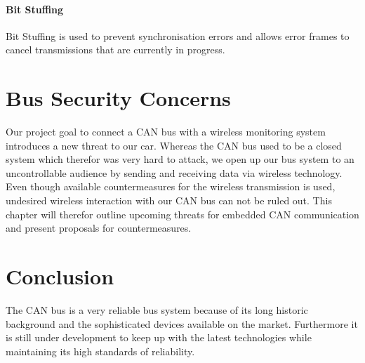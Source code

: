 	\paragraph{Bit Stuffing}
	Bit Stuffing is used to prevent synchronisation errors and allows error frames
	to cancel transmissions that are currently in progress.

\section{Bus Security Concerns}
Our project goal to connect a CAN bus with a wireless monitoring system
introduces a new threat to our car. Whereas the CAN bus used to be a closed
system which therefor was very hard to attack, we open up our bus
system to an uncontrollable audience by sending and receiving data via wireless
technology. Even though available countermeasures for the wireless
transmission is used, undesired wireless interaction with our CAN bus can not be
ruled out. This chapter will therefor outline upcoming threats for embedded CAN
communication and present proposals for countermeasures.

\section{Conclusion}
The CAN bus is a very reliable bus system because of its long historic
background and the sophisticated devices available on the market. Furthermore it
is still under development to keep up with the latest technologies while
maintaining its high standards of reliability.

